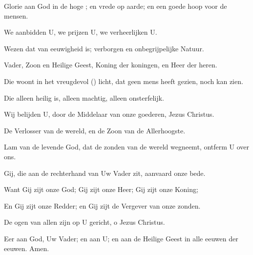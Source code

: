 \documentclass[12pt,twoside,a5paper]{article}
\begin{document}


Glorie aan God in de hoge ; en vrede op aarde; en een goede hoop voor de mensen.

\begin{halfparskip}
  We aanbidden U, we prijzen U, we verheerlijken U.

  Wezen dat van eeuwigheid is; verborgen en onbegrijpelijke Natuur.

  Vader, Zoon en Heilige Geest, Koning der koningen, en Heer der heren.

  Die woont in het vreugdevol () licht, dat geen mens heeft gezien, noch kan zien.

  Die alleen heilig is, alleen machtig, alleen onsterfelijk.

  Wij belijden U, door de Middelaar van onze goederen, Jezus Christus.

  De Verlosser van de wereld, en de Zoon van de Allerhoogste.

  Lam van de levende God, dat de zonden van de wereld wegneemt, ontferm U over ons.

  Gij, die aan de rechterhand van Uw Vader zit, aanvaard onze bede.

  Want Gij zijt onze God; Gij zijt onze Heer; Gij zijt onze Koning;

  En Gij zijt onze Redder; en Gij zijt de Vergever van onze zonden.

  De ogen van allen zijn op U gericht, o Jezus Christus.

  Eer aan God, Uw Vader; en aan U; en aan de Heilige Geest in alle eeuwen der eeuwen. Amen.
\end{halfparskip}
\vspace{0.5em}
\end{document}

